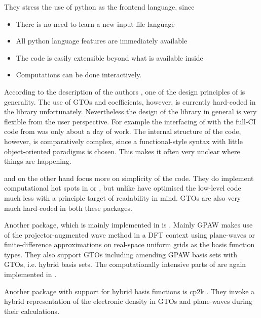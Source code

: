 They stress the use of python as the frontend language, since
\begin{itemize}
	\item There is no need to learn a new input file language
	\item All python language features are immediately available
	\item The code is easily extensible beyond what is available
		inside \pyscf
	\item Computations can be done interactively.
\end{itemize}

According to the description of the authors \cite{Sun2017},
one of the design principles of \pyscf is generality.
The use of GTOs and coefficients, however, is currently
hard-coded in the library unfortunately.
Nevertheless the design of the library in general is very flexible from
the user perspective.
For example the interfacing of \molsturm with the full-CI code
from \pyscf was only about a day of work.
The internal structure of the code, however,
is comparatively complex,
since a functional-style syntax with little object-oriented paradigms is chosen.
This makes it often very unclear where things are happening.


\pyquante and \horton on the other hand focus more on
simplicity of the code.
They do implement computational hot spots in \cee or \cpp,
but unlike \pyscf have optimised the low-level code
much less with a principle target of readability in mind.
GTOs are also very much hard-coded in both these packages.

Another package, which is mainly implemented in \python is \gpaw {}.
Mainly GPAW makes use of the projector-augmented wave method
in a DFT context using plane-waves or finite-difference approximations
on real-space uniform grids as the basis function types.
They also support GTOs including amending GPAW basis sets with GTOs,
i.e. hybrid basis sets.
The computationally intensive parts of \gpaw are again implemented in \cee.

Another package with support for hybrid basis functions is cp2k .
They invoke a hybrid representation of the electronic
density in GTOs and plane-waves during their calculations.

